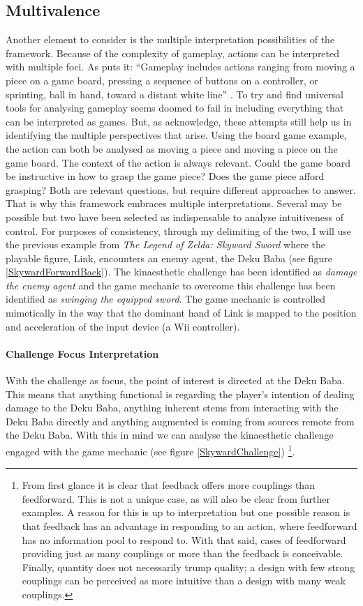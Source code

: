 \subsection{Multivalence}
Another element to consider is the multiple interpretation possibilities of the framework. Because of the complexity of gameplay, actions can be interpreted with multiple foci. As  puts it: ``Gameplay includes actions ranging from moving a piece on a game board, pressing a sequence of buttons on a controller, or sprinting, ball in hand, toward a distant white line'' \cite[p. 8]{calleja}. To try and find universal tools for analysing gameplay seems doomed to fail in including everything that can be interpreted as games. But, as \cite{calleja} acknowledge, these attempts still help us in identifying the multiple perspectives that arise. Using the board game example, the action can both be analysed as moving a piece and moving a piece on the game board. The context of the action is always relevant. Could the game board be instructive in how to grasp the game piece? Does the game piece afford grasping? Both are relevant questions, but require different approaches to answer. That is why this framework embraces multiple interpretations. Several may be possible but two have been selected as indispensable to analyse intuitiveness of control. For purposes of consistency, through my delimiting of the two, I will use the previous example from \textit{The Legend of Zelda: Skyward Sword} \cite{skyward} where the playable figure, Link, encounters an enemy agent, the Deku Baba (see figure \ref{SkywardForwardBack}). The kinaesthetic challenge has been identified as \textit{damage the enemy agent} and the game mechanic to overcome this challenge has been identified as \textit{swinging the equipped sword}. The game mechanic is controlled mimetically in the way that the dominant hand of Link is mapped to the position and acceleration of the input device (a Wii controller).

\paragraph{Challenge Focus Interpretation}
With the challenge as focus, the point of interest is directed at the Deku Baba. This means that anything functional is regarding the player's intention of dealing damage to the Deku Baba, anything inherent stems from interacting with the Deku Baba directly and anything augmented is coming from sources remote from the Deku Baba. With this in mind we can analyse the kinaesthetic challenge engaged with the game mechanic (see figure \ref{SkywardChallenge}) \footnote{From first glance it is clear that feedback offers more couplings than feedforward. This is not a unique case, as will also be clear from further examples. A reason for this is up to interpretation but one possible reason is that feedback has an advantage in responding to an action, where feedforward has no information pool to respond to. With that said, cases of feedforward providing just as many couplings or more than the feedback is conceivable. Finally, quantity does not necessarily trump quality; a design with few strong couplings can be perceived as more intuitive than a design with many weak couplings.}.

